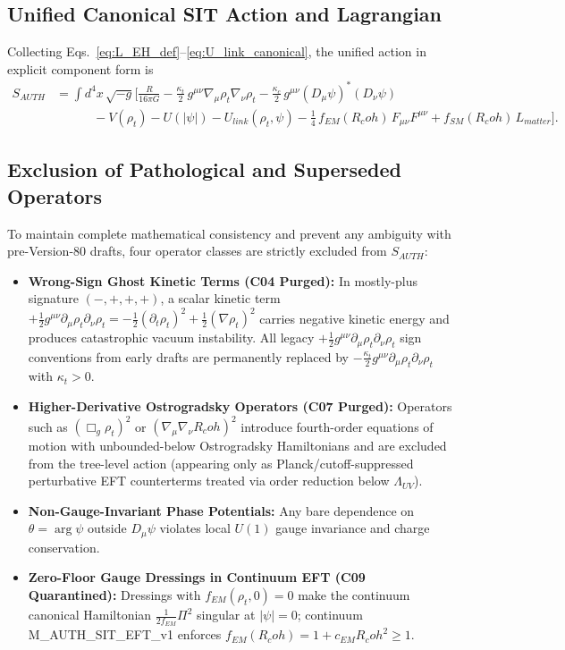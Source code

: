 \documentclass[american,11pt,letterpaper]{article}
\newcommand{\Rcoh}{R_{\mathrm{coh}}}
\def\mathcal#1{#1}%
\def\mathrm#1{#1}%
\def\texttt#1{#1}%
\def\Rcoh{R_coh}%
\begin{document}
\subsection{Unified Canonical SIT Action and Lagrangian}

Collecting Eqs.~\eqref{eq:L_EH_def}--\eqref{eq:U_link_canonical}, the unified action in explicit component form is
\begin{align}
S_{\mathrm{AUTH}}
&= \int d^4x\,\sqrt{-g}\Biggl[
  \frac{R}{16\pi G}
  - \frac{\kappa_t}{2}\,g^{\mu\nu}\nabla_\mu\rho_t\nabla_\nu\rho_t
  - \frac{\kappa_c}{2}\,g^{\mu\nu}(D_\mu\psi)^*(D_\nu\psi)
  \nonumber\\
&\qquad\quad
  - V(\rho_t) - U(|\psi|) - U_{\mathrm{link}}(\rho_t,\psi)
  - \frac{1}{4}\,f_{\mathrm{EM}}(\Rcoh)\,F_{\mu\nu}F^{\mu\nu}
  + f_{\mathrm{SM}}(\Rcoh)\,\mathcal{L}_{\mathrm{matter}}
\Biggr].
\label{eq:SIT_action}
\end{align}

\subsection{Exclusion of Pathological and Superseded Operators}

To maintain complete mathematical consistency and prevent any ambiguity with pre-Version-80 drafts, four operator classes are strictly excluded from $S_{\mathrm{AUTH}}$:
\begin{itemize}
  \item \textbf{Wrong-Sign Ghost Kinetic Terms (\texttt{C04} Purged):} In mostly-plus signature $(-,+,+,+)$, a scalar kinetic term $+\frac{1}{2}g^{\mu\nu}\partial_\mu\rho_t\partial_\nu\rho_t = -\frac{1}{2}(\partial_t\rho_t)^2 + \frac{1}{2}(\nabla\rho_t)^2$ carries negative kinetic energy and produces catastrophic vacuum instability. All legacy $+\frac{1}{2}g^{\mu\nu}\partial_\mu\rho_t\partial_\nu\rho_t$ sign conventions from early drafts are permanently replaced by $-\frac{\kappa_t}{2}g^{\mu\nu}\partial_\mu\rho_t\partial_\nu\rho_t$ with $\kappa_t > 0$.
  \item \textbf{Higher-Derivative Ostrogradsky Operators (\texttt{C07} Purged):} Operators such as $(\Box_g\rho_t)^2$ or $(\nabla_\mu\nabla_\nu\Rcoh)^2$ introduce fourth-order equations of motion with unbounded-below Ostrogradsky Hamiltonians and are excluded from the tree-level action (appearing only as Planck/cutoff-suppressed perturbative EFT counterterms treated via order reduction below $\Lambda_{\mathrm{UV}}$).
  \item \textbf{Non-Gauge-Invariant Phase Potentials:} Any bare dependence on $\theta = \arg\psi$ outside $D_\mu\psi$ violates local $U(1)$ gauge invariance and charge conservation.
  \item \textbf{Zero-Floor Gauge Dressings in Continuum EFT (\texttt{C09} Quarantined):} Dressings with $f_{\mathrm{EM}}(\rho_t, 0) = 0$ make the continuum canonical Hamiltonian $\frac{1}{2f_{\mathrm{EM}}}\Pi^2$ singular at $|\psi| = 0$; continuum \texttt{M\_AUTH\_SIT\_EFT\_v1} enforces $f_{\mathrm{EM}}(\Rcoh) = 1 + c_{\mathrm{EM}}\Rcoh^2 \ge 1$.
\end{itemize}
\end{document}
